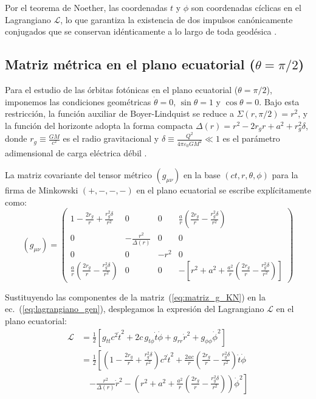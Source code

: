 Por el teorema de Noether, las coordenadas $t$ y $\phi$ son coordenadas cíclicas en el Lagrangiano $\mathcal{L}$, lo que garantiza la existencia de dos impulsos canónicamente conjugados que se conservan idénticamente a lo largo de toda geodésica \citep{05villegas, M_P_Hobson_General_Relativity}.

\subsection{Matriz métrica en el plano ecuatorial \texorpdfstring{($\theta = \pi/2$)}{}}

Para el estudio de las órbitas fotónicas en el plano ecuatorial ($\theta = \pi/2$), imponemos las condiciones geométricas $\dot{\theta} = 0$, $\sin\theta = 1$ y $\cos\theta = 0$. Bajo esta restricción, la función auxiliar de Boyer-Lindquist se reduce a $\Sigma(r,\pi/2) = r^2$, y la función del horizonte adopta la forma compacta $\Delta(r) = r^2 - 2 r_g r + a^2 + r_g^2 \delta$, donde $r_g \equiv \frac{GM}{c^2}$ es el radio gravitacional y $\delta \equiv \frac{Q^2}{4\pi\varepsilon_0 G M^2} \ll 1$ es el parámetro adimensional de carga eléctrica débil \citep{s10052-021-09180-y, 1403.5234v2}.

La matriz covariante del tensor métrico $(g_{\mu\nu})$ en la base $(c t, r, \theta, \phi)$ para la firma de Minkowski $(+,-,-,-)$ en el plano ecuatorial se escribe explícitamente como:
\begin{equation}
    (g_{\mu\nu}) = \begin{pmatrix}
        1 - \frac{2r_g}{r} + \frac{r_g^2 \delta}{r^2} & 0 & 0 & \frac{a}{r}\left(\frac{2r_g}{r} - \frac{r_g^2 \delta}{r^2}\right) \\[0.2cm]
        0 & -\frac{r^2}{\Delta(r)} & 0 & 0 \\[0.2cm]
        0 & 0 & -r^2 & 0 \\[0.2cm]
        \frac{a}{r}\left(\frac{2r_g}{r} - \frac{r_g^2 \delta}{r^2}\right) & 0 & 0 & -\left[ r^2 + a^2 + \frac{a^2}{r}\left(\frac{2r_g}{r} - \frac{r_g^2 \delta}{r^2}\right) \right]
    \end{pmatrix}
    \label{eq:matriz_g_KN}
\end{equation}

Sustituyendo las componentes de la matriz~(\ref{eq:matriz_g_KN}) en la ec.~(\ref{eq:lagrangiano_gen}), desplegamos la expresión del Lagrangiano $\mathcal{L}$ en el plano ecuatorial:
\begin{align}
    \mathcal{L} &= \frac{1}{2} \left[ g_{tt} c^2 \dot{t}^2 + 2 c \, g_{t\phi} \dot{t} \dot{\phi} + g_{rr} \dot{r}^2 + g_{\phi\phi} \dot{\phi}^2 \right] \nonumber \\[0.2cm]
    &= \frac{1}{2} \left[ \left(1 - \frac{2r_g}{r} + \frac{r_g^2 \delta}{r^2}\right) c^2 \dot{t}^2 + \frac{2 a c}{r}\left(\frac{2r_g}{r} - \frac{r_g^2 \delta}{r^2}\right) \dot{t}\dot{\phi} \right. \nonumber \\
    &\quad \left. - \frac{r^2}{\Delta(r)} \dot{r}^2 - \left(r^2 + a^2 + \frac{a^2}{r}\left(\frac{2r_g}{r} - \frac{r_g^2 \delta}{r^2}\right)\right) \dot{\phi}^2 \right]
    \label{eq:L_desarrollado}
\end{align}

